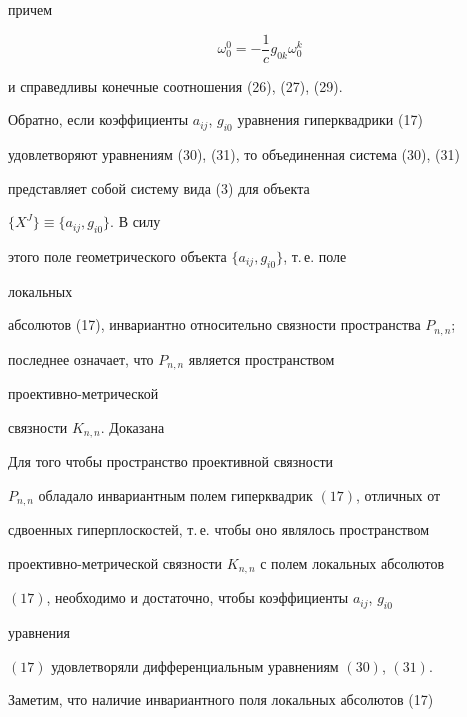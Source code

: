причем 


\begin{equation} 


\omega^0_0=-\frac{1}{c}g_{0k}\omega^k_0 


\end{equation} 


и справедливы конечные соотношения (26), (27), (29). 


 


Обратно, если коэффициенты $a_{ij}$, $g_{i0}$ уравнения гиперквадрики (17) 


удовлетворяют уравнениям (30), (31), то объединенная система (30), (31) 


представляет собой систему вида (3) для объекта 


$\{X^J\}\equiv\{a_{ij},g_{i0}\}$. В силу 


этого поле геометрического объекта $\{a_{ij},g_{i0}\}$, т.\,е. поле 


локальных 


абсолютов (17), инвариантно относительно связности пространства $P_{n,n}$; 


последнее означает, что $P_{n,n}$ является пространством 


проективно-метрической 


связности $K_{n,n}$. Доказана 


 


\begin{thm} 


Для того чтобы пространство проективной связности 


$P_{n,n}$ обладало инвариантным полем гиперквадрик $(17)$, отличных от 


сдвоенных гиперплоскостей, т.\,е. чтобы оно являлось пространством 


проективно-метрической связности $K_{n,n}$ с полем локальных абсолютов 


$(17)$, необходимо и достаточно, чтобы коэффициенты $a_{ij}$, $g_{i0}$ 


уравнения 


$(17)$ удовлетворяли дифференциальным уравнениям $(30)$, $(31)$. 


\end{thm} 


 


Заметим, что наличие инвариантного поля локальных абсолютов (17) 


